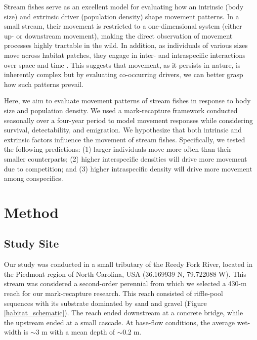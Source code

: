 \documentclass[11pt, class=article, crop=false]{standalone}
\begin{document}
Stream fishes serve as an excellent model for evaluating how an intrinsic (body size) and extrinsic driver (population density) shape movement patterns. In a small stream, their movement is restricted to a one-dimensional system (either up- or downstream movement), making the direct observation of movement processes highly tractable in the wild. In addition, as individuals of various sizes move across habitat patches, they engage in inter- and intraspecific interactions over space and time \citep{brownHabitatHeterogeneityActivity2010, davidsonSeasonalSpatialHydrological2012, robinsonEffectsMultiyearExperimental2003, albaneseEcologicalCorrelatesFish2004, nakayamaFinescaleMovementEcology2018, pettyRestrictedMovementMottled2004, robertsSpatiotemporalVariabilityStream2007}. This suggests that movement, as it persists in nature, is inherently complex but by evaluating co-occurring drivers, we can better grasp how such patterns prevail. 

Here, we aim to evaluate movement patterns of stream fishes in response to body size and population density. We used a mark-recapture framework conducted seasonally over a four-year period to model movement responses while considering survival, detectability, and emigration. We hypothesize that both intrinsic and extrinsic factors influence the movement of stream fishes. Specifically, we tested the following predictions:  (1) larger individuals move more often than their smaller counterparts; (2) higher interspecific densities will drive more movement due to competition; and (3) higher intraspecific density will drive more movement among conspecifics.

\section{Method}

\subsection{Study Site}

Our study was conducted in a small tributary of the Reedy Fork River, located in the Piedmont region of North Carolina, USA (36.169939 N, 79.722088 W). This stream was considered a second-order perennial from which we selected a 430-m reach for our mark-recapture research. This reach consisted of riffle-pool sequences with its substrate dominated by sand and gravel (Figure \ref{habitat_schematic}). The reach ended downstream at a concrete bridge, while the upstream ended at a small cascade. At base-flow conditions, the average wet-width is $\sim$3 m with a mean depth of $\sim$0.2 m. 
\end{document}
